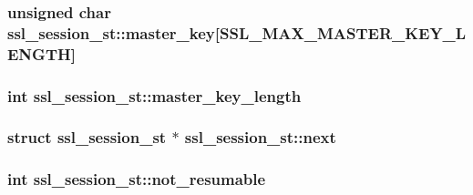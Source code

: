 \subsubsection[{\texorpdfstring{master\+\_\+key}{master_key}}]{\setlength{\rightskip}{0pt plus 5cm}unsigned char ssl\+\_\+session\+\_\+st\+::master\+\_\+key\mbox{[}{\bf S\+S\+L\+\_\+\+M\+A\+X\+\_\+\+M\+A\+S\+T\+E\+R\+\_\+\+K\+E\+Y\+\_\+\+L\+E\+N\+G\+TH}\mbox{]}}\hypertarget{structssl__session__st_ae0d5ecf4472dbff80b1ed36ce9c051c3}{}\label{structssl__session__st_ae0d5ecf4472dbff80b1ed36ce9c051c3}
\subsubsection[{\texorpdfstring{master\+\_\+key\+\_\+length}{master_key_length}}]{\setlength{\rightskip}{0pt plus 5cm}int ssl\+\_\+session\+\_\+st\+::master\+\_\+key\+\_\+length}\hypertarget{structssl__session__st_a368c71211d55bcd3528a752c15e14e5d}{}\label{structssl__session__st_a368c71211d55bcd3528a752c15e14e5d}
\subsubsection[{\texorpdfstring{next}{next}}]{\setlength{\rightskip}{0pt plus 5cm}struct {\bf ssl\+\_\+session\+\_\+st} $\ast$ ssl\+\_\+session\+\_\+st\+::next}\hypertarget{structssl__session__st_accaac56bcf65fe7626e21071e3253d0e}{}\label{structssl__session__st_accaac56bcf65fe7626e21071e3253d0e}
\subsubsection[{\texorpdfstring{not\+\_\+resumable}{not_resumable}}]{\setlength{\rightskip}{0pt plus 5cm}int ssl\+\_\+session\+\_\+st\+::not\+\_\+resumable}\hypertarget{structssl__session__st_a1b4d198b4cf95c73b1e73b06cf521bac}{}\label{structssl__session__st_a1b4d198b4cf95c73b1e73b06cf521bac}
